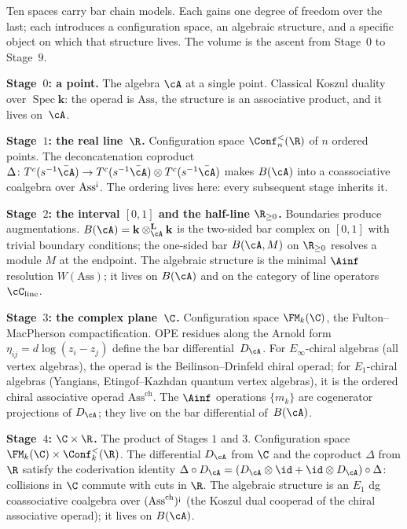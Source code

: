 Ten spaces carry bar chain models. Each gains one degree of
freedom over the last; each introduces a configuration space, an
algebraic structure, and a specific object on which that structure
lives. The volume is the ascent from Stage~$0$ to Stage~$9$.

\smallskip
\noindent\textbf{Stage~$0$: a point.}\enspace
The algebra $\cA$ at a single point. Classical Koszul duality
over $\operatorname{Spec}\mathbf{k}$: the operad is $\mathrm{Ass}$,
the structure is an associative product, and it lives on~$\cA$.

\smallskip
\noindent\textbf{Stage~$1$: the real line~$\R$.}\enspace
Configuration space $\Conf_n^{<}(\R)$ of $n$ ordered points.
The deconcatenation coproduct
$\Delta\colon T^c(s^{-1}\bar\cA) \to
T^c(s^{-1}\bar\cA) \otimes T^c(s^{-1}\bar\cA)$
makes $B(\cA)$ into a coassociative coalgebra over $\mathrm{Ass}^{\scriptstyle\text{\rm !`}}$.
The ordering lives here: every subsequent stage inherits it.

\smallskip
\noindent\textbf{Stage~$2$: the interval $[0,1]$ and the
half-line $\R_{\ge 0}$.}\enspace
Boundaries produce augmentations.
$B(\cA) = \mathbf{k} \otimes_\cA^{\mathbf{L}} \mathbf{k}$
is the two-sided bar complex on $[0,1]$ with trivial boundary
conditions; the one-sided bar $B(\cA, M)$ on $\R_{\ge 0}$
resolves a module $M$ at the endpoint. The algebraic structure
is the minimal $\Ainf$ resolution $W(\mathrm{Ass})$; it lives on
$B(\cA)$ and on the category of line operators
$\cC_{\mathrm{line}}$.

\smallskip
\noindent\textbf{Stage~$3$: the complex plane~$\C$.}\enspace
Configuration space $\FM_k(\C)$, the Fulton--MacPherson
compactification. OPE residues along the Arnold form
$\eta_{ij} = d\log(z_i - z_j)$ define the bar
differential~$D_\cA$. For $E_\infty$-chiral algebras (all
vertex algebras), the operad is the Beilinson--Drinfeld chiral
operad; for $E_1$-chiral algebras (Yangians, Etingof--Kazhdan
quantum vertex algebras), it is the ordered chiral associative
operad $\mathrm{Ass}^{\mathrm{ch}}$. The $\Ainf$ operations
$\{m_k\}$ are cogenerator projections of $D_\cA$; they live on
the bar differential of~$B(\cA)$.

\smallskip
\noindent\textbf{Stage~$4$: $\C \times \R$.}\enspace
The product of Stages $1$ and $3$. Configuration space
$\FM_k(\C) \times \Conf_k^{<}(\R)$. The differential $D_\cA$
from $\C$ and the coproduct $\Delta$ from $\R$ satisfy the
coderivation identity
$\Delta \circ D_\cA
= (D_\cA \otimes \id + \id \otimes D_\cA) \circ \Delta$:
collisions in $\C$ commute with cuts in $\R$.
The algebraic structure is an $E_1$ dg coassociative coalgebra
over $(\mathrm{Ass}^{\mathrm{ch}})^{\scriptstyle\text{\rm !`}}$
(the Koszul dual cooperad of the chiral associative operad);
it lives on $B(\cA)$.

